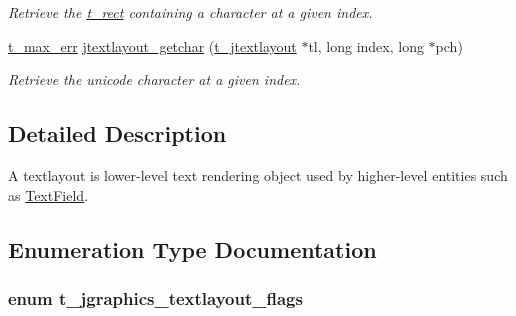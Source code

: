 \begin{DoxyCompactItemize}
\begin{DoxyCompactList}\small\item\em Retrieve the \hyperlink{structt__rect}{t\_\-rect} containing a character at a given index. \item\end{DoxyCompactList}\item 
\hyperlink{group__datatypes_ga73edaae82b318855cc09fac994918165}{t\_\-max\_\-err} \hyperlink{group__textlayout_ga6e1b7c2d44d3cbcb051eda74d8e47ef1}{jtextlayout\_\-getchar} (\hyperlink{group__jgraphics_ga45f6bda6903290bd6040f79fec89872b}{t\_\-jtextlayout} $\ast$tl, long index, long $\ast$pch)
\begin{DoxyCompactList}\small\item\em Retrieve the unicode character at a given index. \item\end{DoxyCompactList}\end{DoxyCompactItemize}


\subsection{Detailed Description}
A textlayout is lower-\/level text rendering object used by higher-\/level entities such as \hyperlink{group__textfield}{TextField}. 

\subsection{Enumeration Type Documentation}
\hypertarget{group__textlayout_ga9b00aebce7fb7877e7e4c13e18b38f08}{
\subsubsection[{t\_\-jgraphics\_\-textlayout\_\-flags}]{\setlength{\rightskip}{0pt plus 5cm}enum {\bf t\_\-jgraphics\_\-textlayout\_\-flags}}}
\label{group__textlayout_ga9b00aebce7fb7877e7e4c13e18b38f08}


